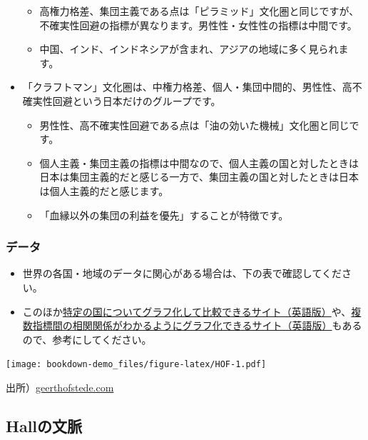 \documentclass[
]{book}
\begin{document}
\begin{itemize}
  \begin{itemize}
  \item
    高権力格差、集団主義である点は「ピラミッド」文化圏と同じですが、不確実性回避の指標が異なります。男性性・女性性の指標は中間です。
  \item
    中国、インド、インドネシアが含まれ、アジアの地域に多く見られます。
  \end{itemize}
\item
  「クラフトマン」文化圏は、中権力格差、個人・集団中間的、男性性、高不確実性回避という日本だけのグループです。

  \begin{itemize}
  \item
    男性性、高不確実性回避である点は「油の効いた機械」文化圏と同じです。
  \item
    個人主義・集団主義の指標は中間なので、個人主義の国と対したときは日本は集団主義的だと感じる一方で、集団主義の国と対したときは日本は個人主義的だと感じます。
  \item
    「血縁以外の集団の利益を優先」することが特徴です。
  \end{itemize}
\end{itemize}

\hypertarget{ux30c7ux30fcux30bf}{%
\subsubsection{データ}\label{ux30c7ux30fcux30bf}}

\begin{itemize}
\item
  世界の各国・地域のデータに関心がある場合は、下の表で確認してください。
\item
  このほか\href{https://www.hofstede-insights.com/country-comparison/}{特定の国についてグラフ化して比較できるサイト（英語版）}や、\href{https://geerthofstede.com/country-comparison-graphs/}{複数指標間の相関関係がわかるようにグラフ化できるサイト（英語版）}もあるので、参考にしてください。
\end{itemize}

\texttt{[image: bookdown-demo\_files/figure-latex/HOF-1.pdf]}

出所）\href{https://geerthofstede.com/research-and-vsm/dimension-data-matrix/}{geerthofstede.com}

\hypertarget{hall}{%
\subsection{Hallの文脈}\label{hall}}
\end{document}

